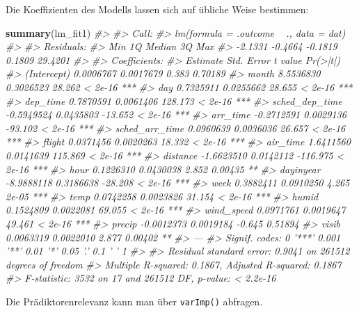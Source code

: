 \documentclass[]{article}
\newenvironment{Shaded}{\begin{snugshade}}{\end{snugshade}}
\newcommand{\CommentTok}[1]{\textcolor[rgb]{0.56,0.35,0.01}{\textit{#1}}}
\newcommand{\KeywordTok}[1]{\textcolor[rgb]{0.13,0.29,0.53}{\textbf{#1}}}
\newcommand{\NormalTok}[1]{#1}
\begin{document}
Die Koeffizienten des Modells lassen sich auf übliche Weise bestimmen:

\begin{Shaded}
\begin{Highlighting}[]
\KeywordTok{summary}\NormalTok{(lm_fit1)}
\CommentTok{#> }
\CommentTok{#> Call:}
\CommentTok{#> lm(formula = .outcome ~ ., data = dat)}
\CommentTok{#> }
\CommentTok{#> Residuals:}
\CommentTok{#>     Min      1Q  Median      3Q     Max }
\CommentTok{#> -2.1331 -0.4664 -0.1819  0.1809 29.4201 }
\CommentTok{#> }
\CommentTok{#> Coefficients:}
\CommentTok{#>                  Estimate Std. Error  t value Pr(>|t|)    }
\CommentTok{#> (Intercept)     0.0006767  0.0017679    0.383  0.70189    }
\CommentTok{#> month           8.5536830  0.3026523   28.262  < 2e-16 ***}
\CommentTok{#> day             0.7325911  0.0255662   28.655  < 2e-16 ***}
\CommentTok{#> dep_time        0.7870591  0.0061406  128.173  < 2e-16 ***}
\CommentTok{#> sched_dep_time -0.5949524  0.0435803  -13.652  < 2e-16 ***}
\CommentTok{#> arr_time       -0.2712591  0.0029136  -93.102  < 2e-16 ***}
\CommentTok{#> sched_arr_time  0.0960639  0.0036036   26.657  < 2e-16 ***}
\CommentTok{#> flight          0.0371456  0.0020263   18.332  < 2e-16 ***}
\CommentTok{#> air_time        1.6411560  0.0141639  115.869  < 2e-16 ***}
\CommentTok{#> distance       -1.6623510  0.0142112 -116.975  < 2e-16 ***}
\CommentTok{#> hour            0.1226310  0.0430038    2.852  0.00435 ** }
\CommentTok{#> dayinyear      -8.9888118  0.3186638  -28.208  < 2e-16 ***}
\CommentTok{#> week            0.3882411  0.0910250    4.265    2e-05 ***}
\CommentTok{#> temp            0.0742258  0.0023826   31.154  < 2e-16 ***}
\CommentTok{#> humid           0.1524809  0.0022081   69.055  < 2e-16 ***}
\CommentTok{#> wind_speed      0.0971761  0.0019647   49.461  < 2e-16 ***}
\CommentTok{#> precip         -0.0012373  0.0019184   -0.645  0.51894    }
\CommentTok{#> visib           0.0063319  0.0022010    2.877  0.00402 ** }
\CommentTok{#> ---}
\CommentTok{#> Signif. codes:  0 '***' 0.001 '**' 0.01 '*' 0.05 '.' 0.1 ' ' 1}
\CommentTok{#> }
\CommentTok{#> Residual standard error: 0.9041 on 261512 degrees of freedom}
\CommentTok{#> Multiple R-squared:  0.1867, Adjusted R-squared:  0.1867 }
\CommentTok{#> F-statistic:  3532 on 17 and 261512 DF,  p-value: < 2.2e-16}
\end{Highlighting}
\end{Shaded}

Die Prädiktorenrelevanz kann man über \texttt{varImp()} abfragen.
\end{document}
